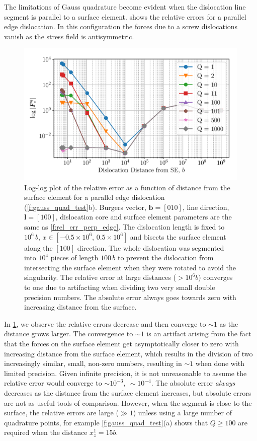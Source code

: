 \documentclass[11pt]{iopart}
\begin{document}
The limitations of Gauss quadrature become evident when the dislocation line segment is parallel to a surface element.  shows the relative errors for a parallel edge dislocation. In this configuration the forces due to a screw dislocations vanish as the stress field is antisymmetric.
%
\begin{figure}[t]
    \centering
    \includegraphics[width=0.8\linewidth]{par_e_z.pdf}
    \caption{Log-log plot of the relative error as a function of distance from the surface element for a parallel edge dislocation (\cref{f:gauss_quad_test}b). Burgers vector, $\bm{b} = [0 1 0]$, line direction, $\bm{l} = [1 0 0]$, dislocation core and surface element parameters are the same as \cref{f:rel_err_perp_edge}. The dislocation length is fixed to $10^{6}\, b,\, x\in\left[-0.5\times10^{6},\, 0.5\times10^{6} \right]$ and bisects the surface element along the $[1 0 0]$ direction. The whole dislocation was segmented into $10^4$ pieces of length $100\, b$ to prevent the dislocation from intersecting the surface element when they were rotated to avoid the singularity. The relative error at large distances ($>10^6 b$) converges to one due to artifacting when dividing two very small double precision numbers. The absolute error always goes towards zero with increasing distance from the surface.}
    \label{f:rel_err_par_edge}
\end{figure}
%
In \cref{f:rel_err_par_edge}, we observe the relative errors decrease and then converge to $\sim 1$ as the distance grows larger. The convergence to $\sim 1$ is an artifact arising from the fact that the forces on the surface element get asymptotically closer to zero with increasing distance from the surface element, which results in the division of two increasingly similar, small, non-zero numbers, resulting in $\sim 1$ when done with limited precision. Given infinite precision, it is not unreasonable to assume the relative error would converge to $\sim10^{-3},~ \sim10^{-4}$. The absolute error \textit{always} decreases as the distance from the surface element increases, but absolute errors are not as useful tools of comparison. However, when the segment is close to the surface, the relative errors are large ($\gg1$) unless using a large number of quadrature points, for example \cref{f:gauss_quad_test}(a) shows that $Q\geq100$ are required when the distance $x^1_z = 15b$.
\end{document}
